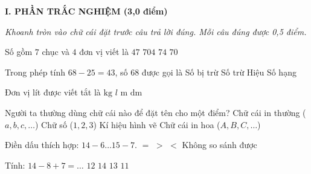 
\setcounter{ex}{0}
\setcounter{bt}{0}

\textbf{\large I. PHẦN TRẮC NGHIỆM (3,0 điểm)}

{\itshape Khoanh tròn vào chữ cái đặt trước câu trả lời đúng. Mỗi câu đúng được 0,5 điểm.}

\begin{ex} %
Số gồm $7$ chục và $4$ đơn vị viết là
\choice
{$47$}
{$704$}
{\True $74$}
{$70$}
\end{ex}

\begin{ex} %
Trong phép tính $68 - 25 = 43$, số $68$ được gọi là
\choice
{\True Số bị trừ}
{Số trừ}
{Hiệu}
{Số hạng}
\end{ex}

\begin{ex} %
Đơn vị lít được viết tắt là
\choice
{$\text{kg}$}
{\True $l$}
{$\text{m}$}
{$\text{dm}$}
\end{ex}

\begin{ex} %
Người ta thường dùng chữ cái nào để đặt tên cho một điểm?
\choice
{Chữ cái in thường ($a, b, c, \dots$)}
{Chữ số ($1, 2, 3$)}
{Kí hiệu hình vẽ}
{\True Chữ cái in hoa ($A, B, C, \dots$)}
\end{ex}

\begin{ex} %
Điền dấu thích hợp: $14 - 6 \dots 15 - 7$.
\choice
{\True $=$}
{$>$}
{$<$}
{Không so sánh được}
\end{ex}

\begin{ex} %
Tính: $14 - 8 + 7 = \dots$
\choice
{$12$}
{$14$}
{\True $13$}
{$11$}
\end{ex}


